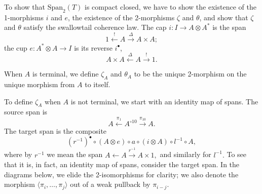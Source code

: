 \documentclass{article}
\newcommand{\maps}{\colon}
\newcommand{\tensor}{\otimes}
\newcommand{\Span}{\mbox{Span}}
\begin{document}
To show that $\Span_2(T)$ is compact closed, we have to show the existence of the 1-morphisms $i$ and $e$, the existence of the 2-morphisms $\zeta$ and $\theta$, and show that $\zeta$ and $\theta$ satisfy the swallowtail coherence law.  The cap $i\maps I \to A \tensor A^*$ is the span $$1 \stackrel{!}{\leftarrow} A \stackrel{\Delta}{\to} A\times A;$$ the cup $e\maps A^* \tensor A \to I$ is its reverse $i^\bullet$, $$A\times A \stackrel{\Delta}{\leftarrow} A \stackrel{!}{\to} 1.$$  

When $A$ is terminal, we define $\zeta_A$ and $\theta_A$ to be the unique 2-morphism on the unique morphism from $A$ to itself.

To define $\zeta_A$ when $A$ is not terminal, we start with an identity map of spans.  The source span is $$A \stackrel{\pi_1}{\leftarrow} A^{\circ 10} \stackrel{\pi_{10}}{\to} A.$$  The target span is the composite $$(r^{-1})^\bullet \circ (A\tensor e)\circ a\circ (i\tensor A)\circ l^{-1} \circ A,$$
where by $r^{-1}$ we mean the span $A \leftarrow A \stackrel{r^{-1}}{\to} A \times 1,$ and similarly for $l^{-1}.$  To see that it is, in fact, an identity map of spans, consider the target span.  In the diagrams below, we elide the 2-isomorphisms for clarity; we also denote the morphism $\langle\pi_i, \ldots, \pi_j\rangle$ out of a weak pullback by $\pi_{i-j}$.
\end{document}
